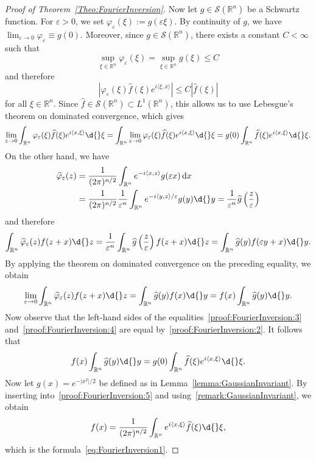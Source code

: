\documentclass[12pt, oneside, a4paper]{article}
\theoremstyle{dfn}
\newcommand{\scalprod}[2]{\langle #1,#2 \rangle}
\def \S {\ensuremath{\mathcal{S}}}
\def \S {\ensuremath{\mathcal{S}}}
\def\Rbb{\ensuremath{\mathbb{R}}}
\def\dx{\,\mathrm dx}
\providecommand{\abs}[1]{\lvert#1\rvert}
\providecommand{\Abs}[1]{\left\lvert#1\right\rvert}
\begin{document}
\begin{proof}[Proof of Theorem~\ref{Theo:FourierInversion}]
Now let $g \in \S(\Rbb^n)$ be a Schwartz function. For $\varepsilon > 0$, we set $\varphi_\varepsilon(\xi) := g (\varepsilon\xi)$. By continuity of $g$, we have $\lim_{\varepsilon \to 0} \varphi_\varepsilon \equiv g(0)$. Moreover, since $g \in \S(\Rbb^n)$, there exists a constant $C < \infty$ such that
\[
\sup_{\xi \in \Rbb^n} \varphi_\varepsilon(\xi) = \sup_{\xi \in \Rbb^n} g(\xi) \leqslant C
\]
and therefore
\[
\Abs{\varphi_\varepsilon(\xi) \widehat{f}(\xi) e^{i\scalprod{\xi}{x}}}
\leqslant C \Abs{\widehat{f}(\xi)}
\]
for all $\xi \in \Rbb^n$. Since $\widehat{f} \in \S(\Rbb^n) \subset L^1(\Rbb^n)$, this allows us to use Lebesgue's theorem on dominated convergence, which gives
\begin{align}
	\lim_{\varepsilon \to 0} \int_{\Rbb^n} \varphi_\varepsilon(\xi) \widehat{f}(\xi) e^{i\scalprod{x}{\xi}} \d{}\xi
	= \int_{\Rbb^n} \lim_{\varepsilon \to 0} \varphi_\varepsilon(\xi) \widehat{f}(\xi) e^{i\scalprod{x}{\xi}} \d{}\xi
	= g(0) \int_{\Rbb^n} \widehat{f}(\xi) e^{i\scalprod{x}{\xi}} \d{}\xi.
\label{proof:FourierInversion:3}
\end{align}
On the other hand, we have
\begin{align*}
	\widehat{\varphi}_\varepsilon(z)
	&= \frac{1}{(2\pi)^{n/2}} \int_{\Rbb^n} e^{-i \scalprod{x}{z}} g(\varepsilon x) \dx \\
	&= \frac{1}{(2\pi)^{n/2}} \frac{1}{\varepsilon^n} \int_{\Rbb^n} e^{-i \scalprod{y}{z}/\varepsilon} g(y) \d{}y
	= \frac{1}{\varepsilon^n} \widehat{g}\left(\frac{z}{\varepsilon}\right)
\end{align*}
and therefore
\begin{align*}
	\int_{\Rbb^n} \widehat{\varphi}_\varepsilon(z) f(z+x) \d{}z
	= \frac{1}{\varepsilon^n} \int_{\Rbb^n} \widehat{g}\left(\frac{z}{\varepsilon}\right) f(z+x) \d{}z
	= \int_{\Rbb^n} \widehat{g}(y) f(\varepsilon y + x) \d{}y.
\end{align*}
By applying the theorem on dominated convergence on the preceding equality, we obtain
\begin{equation}
\lim_{\varepsilon \to 0} \int_{\Rbb^n} \widehat{\varphi}_\varepsilon(z) f(z+x) \d{}z
= \int_{\Rbb^n} \widehat{g}(y) f(x) \d{}y
= f(x) \int_{\Rbb^n} \widehat{g}(y) \d{}y.
\label{proof:FourierInversion:4}
\end{equation}
Now observe that the left-hand sides of the equalities~\eqref{proof:FourierInversion:3} and~\eqref{proof:FourierInversion:4} are equal by~\eqref{proof:FourierInversion:2}. It follows that
\begin{equation}
f(x) \int_{\Rbb^n} \widehat{g}(y) \d{}y = g(0) \int_{\Rbb^n} \widehat{f}(\xi) e^{i\scalprod{x}{\xi}} \d{}\xi.
\label{proof:FourierInversion:5}
\end{equation}
Now let $g(x) = e^{-\abs{x^2}/2}$ be defined as in Lemma~\ref{lemma:GaussianInvariant}. By inserting into~\eqref{proof:FourierInversion:5} and using~\eqref{remark:GaussianInvariant}, we obtain
\[
f(x) = \frac{1}{(2\pi)^{n/2}} \int_{\Rbb^n} e^{i\scalprod{x}{\xi}} \widehat{f}(\xi) \d{}\xi,
\]
which is the formula~\eqref{eq:FourierInversion1}.


\end{proof}
\end{document}
